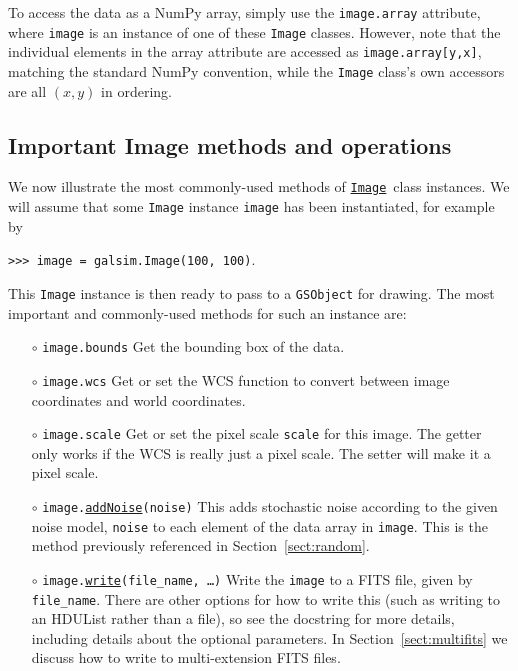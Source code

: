 \documentclass[preprint,10pt]{../../devel/modules/aastex}
\newcommand\Image{\href{http://galsim-developers.github.io/GalSim/classgalsim_1_1image_1_1_image.html}{\texttt{Image}}}
\begin{document}
To access the data as a NumPy array, simply use the \texttt{image.array}
attribute, where \texttt{image} is an instance of one of these
\texttt{Image} classes.  However, note that the individual elements in
the array attribute are accessed as \texttt{image.array[y,x]}, matching
the standard NumPy convention, while the \texttt{Image} class's own
accessors are all $(x,y)$ in ordering.

\subsection{Important Image methods and operations}\label{sect:imagemethods}
We now illustrate the most commonly-used methods of \Image\
class instances.  We will assume that some \texttt{Image} instance
\texttt{image} has been instantiated, for example by

\texttt{>>> image = galsim.Image(100, 100)}.

This \texttt{Image} instance is then ready to pass to a
\texttt{GSObject} for drawing.  The most important and commonly-used
methods for such an instance are:

\begin{itemize}

  \item[$\circ$]
  \texttt{image.bounds}
    \newline
    Get the bounding box of the data.

  \item[$\circ$]
  \texttt{image.wcs}
    \newline
    Get or set the WCS function to convert between
    image coordinates and world coordinates.

  \item[$\circ$]
  \texttt{image.scale}
    \newline
    Get or set the pixel
    scale \texttt{scale} for this image.  The getter only works if the WCS
    is really just a pixel scale.  The setter will make it a pixel scale.

  \item[$\circ$]
  \texttt{image.\href{http://galsim-developers.github.io/GalSim/namespacegalsim_1_1noise.html\#aa45903c801b069774d5eafdbee54bda7}{addNoise}(noise)}
    \newline
    This adds
    stochastic noise according to the given noise model, \texttt{noise}
    to each element of the data array in \texttt{image}.
    This is the method previously referenced in Section~\ref{sect:random}.

  \item[$\circ$]
  \texttt{image.\href{http://galsim-developers.github.io/GalSim/namespacegalsim_1_1fits.html\#a9f3f9dce30942b81d85d2f8928ece310}{write}(file\_name, \dots)}
    \newline
    Write the
    \texttt{image} to a FITS file, given by \texttt{file\_name}.
    There are other options for how to write this (such as writing to an HDUList
    rather than a file), so see the docstring for more details, including
    details about the optional parameters.
    In Section~\ref{sect:multifits} we discuss how to write to multi-extension FITS files.

\end{itemize}
\end{document}

